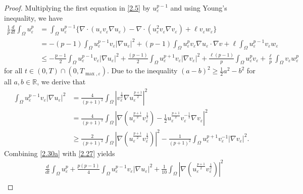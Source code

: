 \documentclass[12pt]{article}
\theoremstyle{plain}
\theoremstyle{definition}
\numberwithin{equation}{section}
\begin{document}
\begin{proof}
    Multiplying the first equation in \eqref{2.5} by $u_\varepsilon^{p-1}$ and using Young's inequality, we have
     \begin{align}\label{2.27}
           \frac{1}{p}\frac{d}{dt}\int_\Omega u_\varepsilon^p&=\int_\Omega u_\varepsilon^{p-1}\{\nabla\cdot(u_\varepsilon v_\varepsilon\nabla u_\varepsilon)-\nabla\cdot(u_\varepsilon^2v_\varepsilon\nabla v_\varepsilon)+\ell v_\varepsilon w_\varepsilon\}\nonumber\\
           &=-(p-1)\int_\Omega u_\varepsilon^{p-1}v_\varepsilon|\nabla u_\varepsilon|^2+(p-1)\int_\Omega u_\varepsilon^pv_\varepsilon\nabla u_\varepsilon\cdot\nabla v+\ell\int_\Omega u_\varepsilon^{p-1}v_\varepsilon w_\varepsilon\\
           &\leq-\frac{p-1}{2}\int_\Omega u_\varepsilon^{p-1}v_\varepsilon|\nabla u_\varepsilon|^2+\frac{(p-1)}{2}\int_\Omega u_\varepsilon^{p+1}v_\varepsilon|\nabla v_\varepsilon|^2+\frac{\ell(p-1)}{p}\int_\Omega u_\varepsilon^pv_\varepsilon+\frac{\ell}{p}\int_\Omega v_\varepsilon w_\varepsilon^{p}\nonumber
    \end{align}
    for all $t\in(0,T)\cap(0,T_{\max,\varepsilon})$. Due to the inequality $(a-b)^2\geq\frac{1}{2}a^2-b^2$ for all $a,b\in\mathbb{R}$, we derive that
    \begin{equation}\label{2.30a}
        \begin{split}
            \int_\Omega u_\varepsilon^{p-1}v_\varepsilon|\nabla u_\varepsilon|^2&=\frac{4}{(p+1)^2}\int_\Omega|v_\varepsilon^{\frac{1}{2}}\nabla u_\varepsilon^{\frac{p+1}{2}}|^2
            \\
            &=\frac{4}{(p+1)^2}\int_\Omega|\nabla(u_\varepsilon^{\frac{p+1}{2}}v_\varepsilon^{\frac{1}{2}})-\frac{1}{2}u_\varepsilon^{\frac{p+1}{2}}v_\varepsilon^{-\frac{1}{2}}\nabla v_\varepsilon|^2\\
            &\geq\frac{2}{(p+1)^2}\int_\Omega|\nabla(u_\varepsilon^{\frac{p+1}{2}}v_\varepsilon^{\frac{1}{2}})|^2-\frac{1}{(p+1)^2}\int_\Omega u_\varepsilon^{p+1}v_\varepsilon^{-1}|\nabla v_\varepsilon|^2.
        \end{split}
    \end{equation}
   Combining  \eqref{2.30a} with  \eqref{2.27} yields
      \begin{align}\label{2.31a}
           &\frac{d}{dt}\int_\Omega u_\varepsilon^p
           + \frac{p(p-1)}{4}\int_\Omega u_\varepsilon^{p-1}v_\varepsilon|\nabla u_\varepsilon|^2
           +\frac1{10}\int_\Omega|\nabla(u_\varepsilon^{\frac{p+1}{2}}v_\varepsilon^{\frac{1}{2}})|^2           \\

\end{align}
\end{proof}
\end{document}
